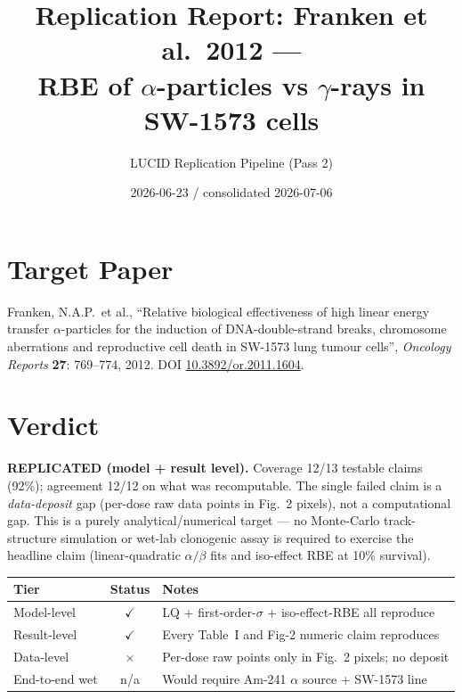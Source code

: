\documentclass[11pt]{article}
\title{Replication Report: Franken et al.\ 2012 --- \\
RBE of $\alpha$-particles vs $\gamma$-rays in SW-1573 cells}
\author{LUCID Replication Pipeline (Pass 2)}
\date{2026-06-23 / consolidated 2026-07-06}
\begin{document}
\maketitle

\section*{Target Paper}
Franken, N.A.P.\ et al., ``Relative biological effectiveness of high linear
energy transfer $\alpha$-particles for the induction of DNA-double-strand
breaks, chromosome aberrations and reproductive cell death in SW-1573 lung
tumour cells'', \emph{Oncology Reports} \textbf{27}: 769--774, 2012.
DOI \href{https://doi.org/10.3892/or.2011.1604}{10.3892/or.2011.1604}.

\section{Verdict}

\textbf{REPLICATED (model + result level).} Coverage 12/13 testable claims
(92\%); agreement 12/12 on what was recomputable. The single failed claim
is a \emph{data-deposit} gap (per-dose raw data points in Fig.\ 2 pixels),
not a computational gap. This is a purely analytical/numerical target ---
no Monte-Carlo track-structure simulation or wet-lab clonogenic assay is
required to exercise the headline claim (linear-quadratic $\alpha/\beta$
fits and iso-effect RBE at 10\% survival).

\begin{center}
\begin{tabular}{lcl}
\toprule
Tier & Status & Notes \\
\midrule
Model-level     & \textcolor{green!60!black}{$\checkmark$} & LQ + first-order-$\sigma$ + iso-effect-RBE all reproduce \\
Result-level    & \textcolor{green!60!black}{$\checkmark$} & Every Table~I and Fig-2 numeric claim reproduces \\
Data-level      & \textcolor{red!70!black}{$\times$}       & Per-dose raw points only in Fig.~2 pixels; no deposit \\
End-to-end wet  & n/a & Would require Am-241 $\alpha$ source + SW-1573 line \\
\bottomrule
\end{tabular}
\end{center}
\end{document}
